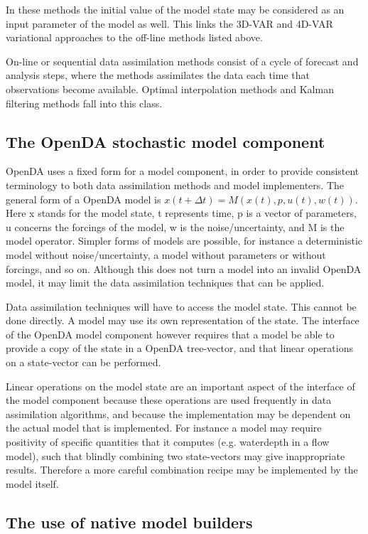 In these methods the initial value of the model state may be considered as an input parameter of the model as well. This links the 3D-VAR and 4D-VAR variational approaches to the off-line methods listed above.

On-line or sequential data assimilation methods consist of a cycle of forecast and analysis steps, where the methods assimilates the data each time that observations become available. Optimal interpolation methods and Kalman filtering methods fall into this class.

\subsection{The OpenDA stochastic model component}

OpenDA uses a fixed form for a model component, in order to provide consistent terminology to both data assimilation methods and model implementers. The general form of a OpenDA model is
$x(t+\Delta t) = M(x(t), p, u(t), w(t))$.
Here x stands for the model state, t represents time, p is a vector of parameters, u concerns the forcings of the model, w is the noise/uncertainty, and M is the model operator. Simpler forms of models are possible, for instance a deterministic model without noise/uncertainty, a model without parameters or without forcings, and so on. Although this does not turn a model into an invalid OpenDA model, it may limit the data assimilation techniques that can be applied.

Data assimilation techniques will have to access the model state. This cannot be done directly. A model may use its own representation of the state. The interface of the OpenDA model component however requires that a model be able to provide a copy of the state in a OpenDA tree-vector, and that linear operations on a state-vector can be performed.

Linear operations on the model state are an important aspect of the interface of the model component because these operations are used frequently in data assimilation algorithms, and because the implementation may be dependent on the actual model that is implemented. For instance a model may require positivity of specific quantities that it computes (e.g. waterdepth in a flow model), such that blindly combining two state-vectors may give inappropriate results. Therefore a more careful combination recipe may be implemented by the model itself. 

\subsection{The use of native model builders}

